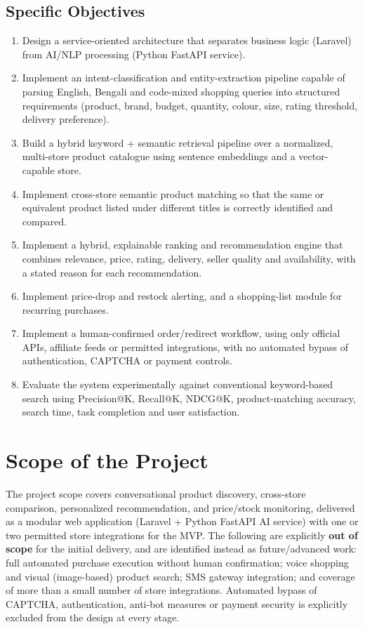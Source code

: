 \documentclass[12pt,a4paper]{article}
\begin{document}
\subsection{Specific Objectives}
\begin{enumerate}[leftmargin=1.3cm]
    \item Design a service-oriented architecture that separates business logic (Laravel) from AI/NLP processing
    (Python FastAPI service).
    \item Implement an intent-classification and entity-extraction pipeline capable of parsing English,
    Bengali and code-mixed shopping queries into structured requirements (product, brand, budget, quantity,
    colour, size, rating threshold, delivery preference).
    \item Build a hybrid keyword + semantic retrieval pipeline over a normalized, multi-store product catalogue
    using sentence embeddings and a vector-capable store.
    \item Implement cross-store semantic product matching so that the same or equivalent product listed under
    different titles is correctly identified and compared.
    \item Implement a hybrid, explainable ranking and recommendation engine that combines relevance, price,
    rating, delivery, seller quality and availability, with a stated reason for each recommendation.
    \item Implement price-drop and restock alerting, and a shopping-list module for recurring purchases.
    \item Implement a human-confirmed order/redirect workflow, using only official APIs, affiliate feeds or
    permitted integrations, with no automated bypass of authentication, CAPTCHA or payment controls.
    \item Evaluate the system experimentally against conventional keyword-based search using Precision@K,
    Recall@K, NDCG@K, product-matching accuracy, search time, task completion and user satisfaction.
\end{enumerate}

\section{Scope of the Project}

The project scope covers conversational product discovery, cross-store comparison, personalized recommendation,
and price/stock monitoring, delivered as a modular web application (Laravel + Python FastAPI AI service) with one
or two permitted store integrations for the MVP. The following are explicitly \textbf{out of scope} for the
initial delivery, and are identified instead as future/advanced work: full automated purchase execution without
human confirmation; voice shopping and visual (image-based) product search; SMS gateway integration; and coverage
of more than a small number of store integrations. Automated bypass of CAPTCHA, authentication, anti-bot measures
or payment security is explicitly excluded from the design at every stage.
\end{document}
